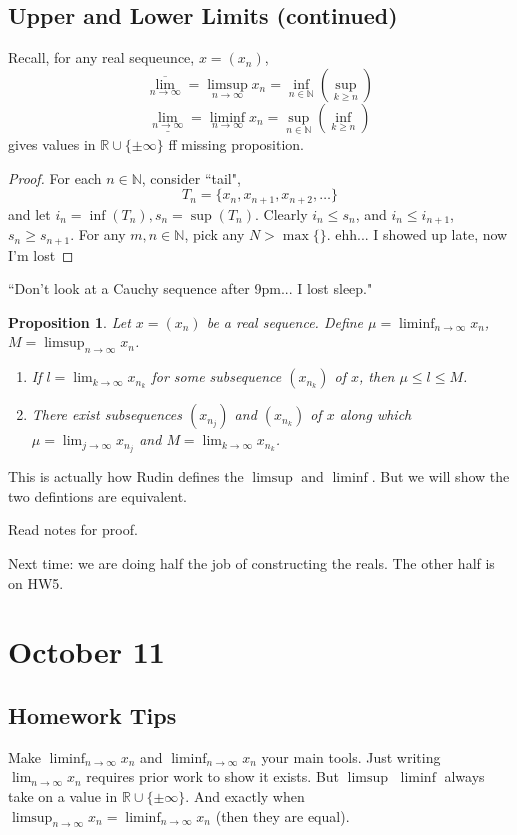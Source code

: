 \documentclass{article}
\theoremstyle{plain}
\newtheorem{proposition}{Proposition}
\theoremstyle{remark}
\newcommand{\N}{{\mathbb N}}
\newcommand{\R}{{\mathbb R}}
\begin{document}
\subsection{Upper and Lower Limits (continued)}
Recall, for any real sequeunce, $x = (x_n)$,
\[
	\overline{\lim_{n\to\infty}} = \limsup_{n \to \infty} x_n = \inf_{n\in\N}\left(\sup_{k\geq n}\right)
\]
\[
	\underline{\lim_{n\to\infty}} = \liminf_{n \to \infty} x_n = \sup_{n\in\N}\left(\inf_{k\geq n}\right)
\]
gives values in $\R \cup \{\pm\infty\}$
ff missing proposition.

\begin{proof}
	For each $n \in \N$, consider ``tail",
	\[
		T_n = \{x_n,x_{n+1},x_{n+2}, \dots \}
	\]
	and let $i_n = \inf(T_n), s_n = \sup(T_n)$.
	Clearly $i_n \leq s_n$, and $i_n \leq i_{n+1}$, $s_n \geq s_{n+1}$.
	For any $m,n\in\N$, pick any $N> \max\{\}$.
	ehh... I showed up late, now I'm lost
\end{proof}
``Don't look at a Cauchy sequence after 9pm... I lost sleep."


\begin{proposition}
	Let $x = (x_n)$ be a real sequence.
	Define $\mu = \liminf_{n\to\infty} x_n$, $M = \limsup_{n\to\infty} x_n$.
	\begin{enumerate}
		\item If $l = \lim_{k\to\infty}x_{n_k}$ for some subsequence $(x_{n_k})$ of $x$,
			then $\mu \leq l \leq M$.
		\item There exist subsequences $(x_{n_j})$ and $(x_{n_k})$
			of $x$ along which $\mu = \lim_{j\to\infty} x_{n_j}$ and $M = \lim_{k\to\infty} x_{n_k}$.
	\end{enumerate}
\end{proposition}
This is actually how Rudin defines the $\limsup$ and $\liminf$.
But we will show the two defintions are equivalent.

Read notes for proof.

Next time: we are doing half the job of constructing the reals. The other half is on HW5.

\section{October 11}
\subsection{Homework Tips}
Make $\liminf_{n\to\infty}x_n$ and $\liminf_{n\to\infty}x_n$ your main tools.
Just writing $\lim_{n\to\infty} x_n$ requires prior work to show it exists.
But $\limsup$ $\liminf$ always take on a value in $\R \cup\{\pm \infty\}$.
And exactly when $\limsup_{n\to\infty}x_n = \liminf_{n\to\infty} x_n$
(then they are equal).
\end{document}
